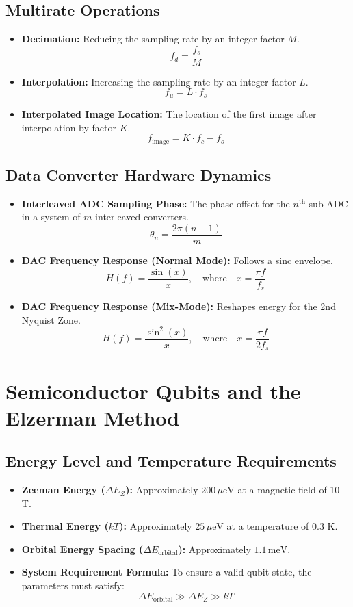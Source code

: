 \documentclass{article}
\begin{document}
\subsection*{Multirate Operations}
\begin{itemize}
    \item \textbf{Decimation:} Reducing the sampling rate by an integer factor $M$.
    \[
    f_d = \frac{f_s}{M}
    \]
    \item \textbf{Interpolation:} Increasing the sampling rate by an integer factor $L$.
    \[
    f_u = L \cdot f_s
    \]
    \item \textbf{Interpolated Image Location:} The location of the first image after interpolation by factor $K$.
    \[
    f_{\text{image}} = K \cdot f_c - f_o
    \]
\end{itemize}

\subsection*{Data Converter Hardware Dynamics}
\begin{itemize}
    \item \textbf{Interleaved ADC Sampling Phase:} The phase offset for the $n^{\text{th}}$ sub-ADC in a system of $m$ interleaved converters.
    \[
    \theta_n = \frac{2\pi(n - 1)}{m}
    \]
    \item \textbf{DAC Frequency Response (Normal Mode):} Follows a sinc envelope.
    \[
    H(f) = \frac{\sin(x)}{x}, \quad \text{where} \quad x = \frac{\pi f}{f_s}
    \]
    \item \textbf{DAC Frequency Response (Mix-Mode):} Reshapes energy for the 2nd Nyquist Zone.
    \[
    H(f) = \frac{\sin^2(x)}{x}, \quad \text{where} \quad x = \frac{\pi f}{2f_s}
    \]
\end{itemize}

\newpage
\section{Semiconductor Qubits and the Elzerman Method}

\subsection*{Energy Level and Temperature Requirements}
\begin{itemize}
    \item \textbf{Zeeman Energy ($\Delta E_Z$):} Approximately $200 \, \mu\text{eV}$ at a magnetic field of 10 T.
    \item \textbf{Thermal Energy ($kT$):} Approximately $25 \, \mu\text{eV}$ at a temperature of 0.3 K.
    \item \textbf{Orbital Energy Spacing ($\Delta E_{\text{orbital}}$):} Approximately $1.1 \, \text{meV}$.
    \item \textbf{System Requirement Formula:} To ensure a valid qubit state, the parameters must satisfy:
    \[
    \Delta E_{\text{orbital}} \gg \Delta E_Z \gg kT
    \]
\end{itemize}
\end{document}
